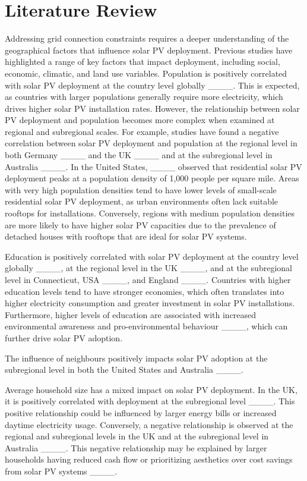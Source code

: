 \section{Literature Review}
Addressing grid connection constraints requires a deeper understanding of the geographical factors that influence solar PV deployment. Previous studies have highlighted a range of key factors that impact deployment, including social, economic, climatic, and land use variables. Population is positively correlated with solar PV deployment at the country level globally ____. This is expected, as countries with larger populations generally require more electricity, which drives higher solar PV installation rates. However, the relationship between solar PV deployment and population becomes more complex when examined at regional and subregional scales. For example, studies have found a negative correlation between solar PV deployment and population at the regional level in both Germany ____ and the UK ____ and at the subregional level in Australia ____. In the United States, ____ observed that residential solar PV deployment peaks at a population density of 1,000 people per square mile. Areas with very high population densities tend to have lower levels of small-scale residential solar PV deployment, as urban environments often lack suitable rooftops for installations. Conversely, regions with medium population densities are more likely to have higher solar PV capacities due to the prevalence of detached houses with rooftops that are ideal for solar PV systems. 

Education is positively correlated with solar PV deployment at the country level globally ____, at the regional level in the UK ____, and at the subregional level in Connecticut, USA ____, and England ____. Countries with higher education levels tend to have stronger economies, which often translates into higher electricity consumption and greater investment in solar PV installations. Furthermore, higher levels of education are associated with increased environmental awareness and pro-environmental behaviour ____, which can further drive solar PV adoption.

The influence of neighbours positively impacts solar PV adoption at the subregional level in both the United States and Australia ____.

Average household size has a mixed impact on solar PV deployment. In the UK, it is positively correlated with deployment at the subregional level ____. This positive relationship could be influenced by larger energy bills or increased daytime electricity usage. Conversely, a negative relationship is observed at the regional and subregional levels in the UK and at the subregional level in Australia ____. This negative relationship may be explained by larger households having reduced cash flow or prioritizing aesthetics over cost savings from solar PV systems ____.

